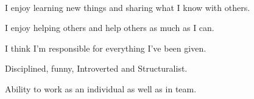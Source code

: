 

    ‌

    \begin{cvitems} %
        \item {I enjoy learning new things and sharing what I know with others.}
        \item {I enjoy helping others and help others as much as I can.}
        \item {I think I'm responsible for everything I've been given.}
        \item {Disciplined, funny, Introverted and Structuralist.}
        \item {Ability to work as an individual as well as in team.}
    \end{cvitems}

